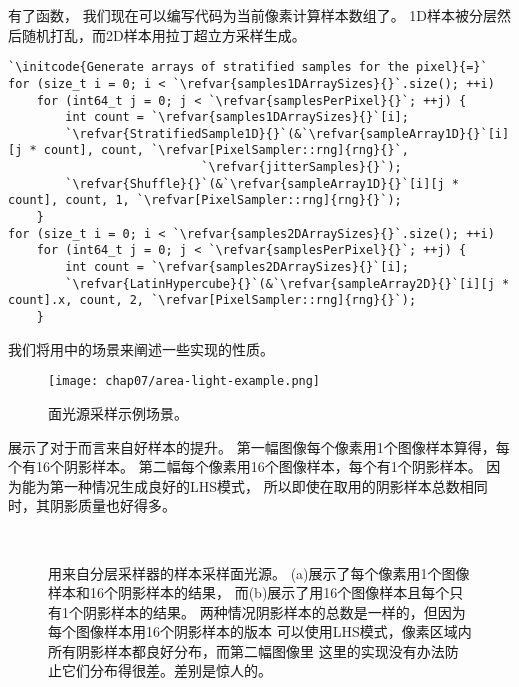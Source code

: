 有了函数，
我们现在可以编写代码为当前像素计算样本数组了。
1D样本被分层然后随机打乱，而2D样本用拉丁超立方采样生成。
\begin{lstlisting}
`\initcode{Generate arrays of stratified samples for the pixel}{=}`
for (size_t i = 0; i < `\refvar{samples1DArraySizes}{}`.size(); ++i)
    for (int64_t j = 0; j < `\refvar{samplesPerPixel}{}`; ++j) {
        int count = `\refvar{samples1DArraySizes}{}`[i];
        `\refvar{StratifiedSample1D}{}`(&`\refvar{sampleArray1D}{}`[i][j * count], count, `\refvar[PixelSampler::rng]{rng}{}`,
                           `\refvar{jitterSamples}{}`);
        `\refvar{Shuffle}{}`(&`\refvar{sampleArray1D}{}`[i][j * count], count, 1, `\refvar[PixelSampler::rng]{rng}{}`);
    }
for (size_t i = 0; i < `\refvar{samples2DArraySizes}{}`.size(); ++i)
    for (int64_t j = 0; j < `\refvar{samplesPerPixel}{}`; ++j) {
        int count = `\refvar{samples2DArraySizes}{}`[i];
        `\refvar{LatinHypercube}{}`(&`\refvar{sampleArray2D}{}`[i][j * count].x, count, 2, `\refvar[PixelSampler::rng]{rng}{}`);
    }
\end{lstlisting}

我们将用中的场景来阐述一些实现的性质。
\begin{figure}[htbp]
    \centering\texttt{[image: chap07/area-light-example.png]}
    \caption{面光源采样示例场景。}
    \label{fig:7.23}
\end{figure}

展示了对于而言来自好样本的提升。
第一幅图像每个像素用1个图像样本算得，每个有16个阴影样本。
第二幅每个像素用16个图像样本，每个有1个阴影样本。
因为能为第一种情况生成良好的LHS模式，
所以即使在取用的阴影样本总数相同时，其阴影质量也好得多。

\begin{figure}[htbp]
    \centering
    \\
    \caption{用来自分层采样器的样本采样面光源。
        (a)展示了每个像素用1个图像样本和16个阴影样本的结果，
        而(b)展示了用16个图像样本且每个只有1个阴影样本的结果。
        两种情况阴影样本的总数是一样的，但因为每个图像样本用16个阴影样本的版本
        可以使用LHS模式，像素区域内所有阴影样本都良好分布，而第二幅图像里
        这里的实现没有办法防止它们分布得很差。差别是惊人的。}
    \label{fig:7.24}
\end{figure}